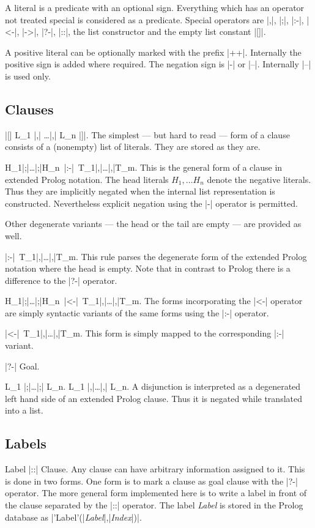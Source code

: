 A  literal  is a predicate  with  an optional sign.   Everything  which has an
operator not  treated special is considered  as a predicate. Special operators
are |,|, |;|, |:-|, |<-|, |->|, |?-|, |::|, the list constructor and the empty
list constant |[]|.

A positive literal can  be optionally marked with  the prefix |++|. Internally
the positive sign  is added where required. The  negation sign is |-| or |--|.
Internally |--| is used only.


\subsection{Clauses}

\SYNTAX |[| L_1 |,| \ldots|,| L_n |]|.
%
The simplest  --- but  hard   to read ---  form  of  a  clause consists of   a
(nonempty) list of literals. They are stored as they are.


\SYNTAX H_1|;|\ldots|;|H_n \,|:-|\, T_1|,|\ldots|,|T_m.
%
This is the general  form of a clause  in  extended Prolog notation.  The head
literals $H_1,\ldots  H_n$  denote  the   negative  literals. Thus  they   are
implicitly  negated when   the internal list  representation is  constructed.
Nevertheless explicit negation using the |-| operator is permitted.

Other degenerate variants --- the head or the tail are  empty --- are provided
as well.


\SYNTAX |:-|\, T_1|,|\ldots|,|T_m.
%
This rule parses the degenerate form of the extended Prolog notation where the
head is empty. Note that  in contrast to Prolog there  is a difference to  the
|?-| operator.


\SYNTAX  H_1|;|\ldots|;|H_n \,|<-|\, T_1|,|\ldots|,|T_m.
%
The forms incorporating the |<-| operator are simply syntactic variants of the
same forms using the |:-| operator.


\SYNTAX |<-|\, T_1|,|\ldots|,|T_m.
%
This form is simply mapped to the corresponding |:-| variant.


\SYNTAX |?-| Goal.
%


\SYNTAX L_1 |;|\ldots|;| L_n.
\SYNTAX L_1 |,|\ldots|,| L_n.
%
A disjunction  is interpreted as  a degenerated left  hand side of an extended
Prolog clause. Thus it is negated while translated into a list.


\subsection{Labels}

\SYNTAX Label |::| Clause.
%
Any clause can have arbitrary information assigned to it.  This is done in two
forms. One form is to mark a clause as goal clause with the |?-| operator. The
more general form implemented here is to write a label  in front of the clause
separated  by the |::| operator.   The label {\em Label}\/  is  stored in  the
Prolog database as |'Label'(|{\em Label}|,|{\em Index}|)|.

